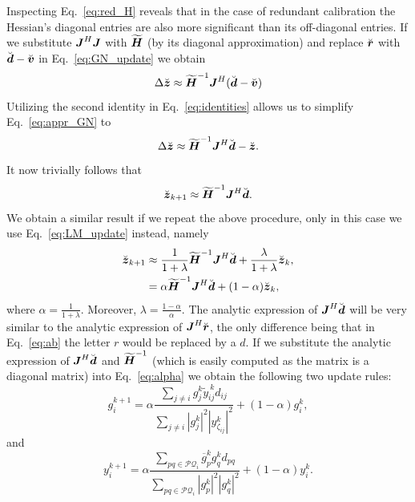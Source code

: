 \documentclass[useAMS,usenatbib]{mn2e}
\newcommand{\bz}{\bmath{z}}
\newcommand{\br}{\bmath{r}}
\newcommand{\bd}{\bmath{d}}
\newcommand{\bv}{\bmath{v}}
\newcommand{\bJ}{\bmath{J}}
\newcommand{\bH}{\bmath{H}}
\newcommand{\conj}[1]{\overline{#1}}
\begin{document}
Inspecting Eq.~\eqref{eq:red_H} reveals that in the case of redundant calibration the Hessian's diagonal entries are also more significant than its off-diagonal entries.
If we substitute $\bJ^H\bJ$ with $\widetilde{\bH}$ (by its diagonal approximation) and replace $\breve{\br}$ with $\breve{\bd} - \breve{\bv}$ in Eq.~\eqref{eq:GN_update} we obtain
\begin{equation}
\label{eq:appr_GN}
 \Delta \breve{\bz} \approx \widetilde{\bH}^{-1}\bJ^H(\breve{\bd}-\breve{\bv})
\end{equation}
Utilizing the second identity in Eq.~\eqref{eq:identities} allows us to simplify Eq.~\eqref{eq:appr_GN} to
\begin{equation}
  \Delta \breve{\bz} \approx \widetilde{\bH}^{-1}\bJ^H\breve{\bd}-\breve{\bz}.
\end{equation}
It now trivially follows that
\begin{equation}
 \breve{\bz}_{k+1} \approx \widetilde{\bH}^{-1}\bJ^H\breve{\bd}.
\end{equation}
We obtain a similar result if we repeat the above procedure, only in this case we use Eq.~\eqref{eq:LM_update} instead,
namely
\begin{align}
\breve{\bz}_{k+1} &\approx \frac{1}{1+\lambda}\widetilde{\bH}^{-1}\bJ^H\breve{\bd} + \frac{\lambda}{1+\lambda} \breve{\bz}_k,\label{eq:lambda}\\
 &= \alpha \widetilde{\bH}^{-1}\bJ^H\breve{\bd} + (1-\alpha)\breve{\bz}_k, \label{eq:alpha}  
\end{align}
where $\alpha = \frac{1}{1+\lambda}$. Moreover, $\lambda = \frac{1-\alpha}{\alpha}$. The analytic expression of $\bJ^H\breve{\bd}$ will be very similar to the analytic 
expression of $\bJ^H\breve{\br}$, the only difference being that in Eq.~\eqref{eq:ab} the letter $r$ would be replaced by a $d$. If we substitute the analytic expression
of $\bJ^H\breve{\bd}$ and $\widetilde{\bH}^{-1}$ (which is easily computed as the matrix is a diagonal matrix) into Eq.~\eqref{eq:alpha} we obtain the following two update rules:
\begin{equation}
\label{eq:g_update}
g_{i}^{k+1} = \alpha \frac{\sum_{j\neq i} g_j^k \widetilde{y}_{ij}^{~\!\!k} d_{ij}}{\sum_{j\neq i} |g_j^k|^2|y_{\zeta_{ij}}^k|^2} + (1-\alpha) g_i^k, 
\end{equation}
and
\begin{equation}
\label{eq:y_update}
y_{i}^{k+1} = \alpha \frac{\sum_{pq \in \mathcal{PQ}_i} \conj{g}_p^k g_q^k d_{pq}}{\sum_{pq \in \mathcal{PQ}_i}|g_p^k|^2|g_q^k|^2} + (1-\alpha) y_i^k. 
\end{equation}
\end{document}
